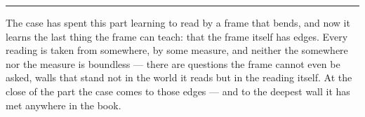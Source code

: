 %
%
%
%

\bigskip
\begin{center}
\rule{0.4\textwidth}{0.4pt}
\end{center}
\bigskip

\noindent The case has spent this part learning to read by a frame that bends, and now it learns the last thing
the frame can teach: that the frame itself has edges. Every reading is taken from somewhere, by some measure,
and neither the somewhere nor the measure is boundless --- there are questions the frame cannot even be asked,
walls that stand not in the world it reads but in the reading itself. At the close of the part the case comes to
those edges --- and to the deepest wall it has met anywhere in the book.

